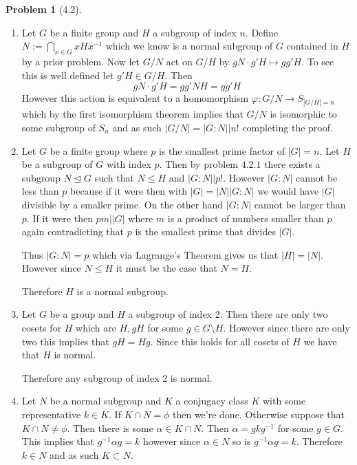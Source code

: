 \documentclass[10pt]{article}
\theoremstyle{plain}
\newtheorem{problem}{Problem}
\theoremstyle{remark}
\begin{document}
\begin{problem}[4.2]
  
\end{problem}

\begin{enumerate}
\item Let $G$ be a finite group and $H$ a subgroup of index $n$.
  Define $N:=\bigcap_{x\in G}xHx^{-1}$ which we know is a normal subgroup
  of $G$ contained in $H$ by a prior problem. Now let $G/N$ act
  on $G/H$ by $gN\cdot g'H\mapsto gg'H$. To see this is well defined
  let $g'H\in G/H$. Then
  \[ gN\cdot g'H=gg'NH=gg'H\]
  However this action is equivalent to a homomorphism
  $\varphi:G/N\rightarrow S_{|G/H|=n}$ which by the first isomorphism
  theorem implies that $G/N$ is isomorphic to some subgroup
  of $S_n$ and as such $|G/N|=|G:N|\bigr| n!$ completing the
  proof.
  
\item Let $G$ be a finite group where $p$ is the smallest
  prime factor of $|G|=n$. Let $H$ be a subgroup of $G$
  with index $p$. Then by problem $4.2.1$ there exists a
  subgroup $N\trianglelefteq G$ such that $N\leq H$ and
  $|G:N|\bigr| p!$. However $|G:N|$ cannot be less than $p$
  because if it were then with $|G|=|N||G:N|$ we would
  have $|G|$ divisible by a smaller prime. On the other
  hand $|G:N|$ cannot be larger than $p$. If it were
  then $pm\bigr||G|$ where $m$ is a product of numbers
  smaller than $p$ again contradicting that $p$ is the
  smallest prime that divides $|G|$.

  Thus $|G:N|=p$ which via Lagrange's Theorem
  gives us that $|H|=|N|$. However since $N\leq H$
  it must be the case that $N=H$.

  Therefore $H$ is a normal subgroup.
\item Let $G$ be a group and $H$ a subgroup of index 2.
  Then there are only two cosets for $H$ which are
  $H,gH$ for some  $g\in G\setminus H$. However since there are
  only two this implies that $gH= Hg$. Since this holds
  for all cosets of $H$ we have that $H$ is normal.

  Therefore any subgroup of index 2 is normal.
  
\item Let $N$ be a normal subgroup and $K$ a
  conjugacy class $K$ with some representative $k\in K$.
  If $K\cap N=\phi$ then we're done. Otherwise suppose
  that $K\cap N\neq \phi$. Then there is some $\alpha\in K\cap N$. Then
  $\alpha=gkg^{-1}$ for some $g\in G$. This implies that
  $g^{-1}\alpha g = k$ however since $\alpha\in N$ so is $g^{-1}\alpha g = k$.
  Therefore $k\in N$ and as such $K\subset N$.
\end{enumerate}
\end{document}
